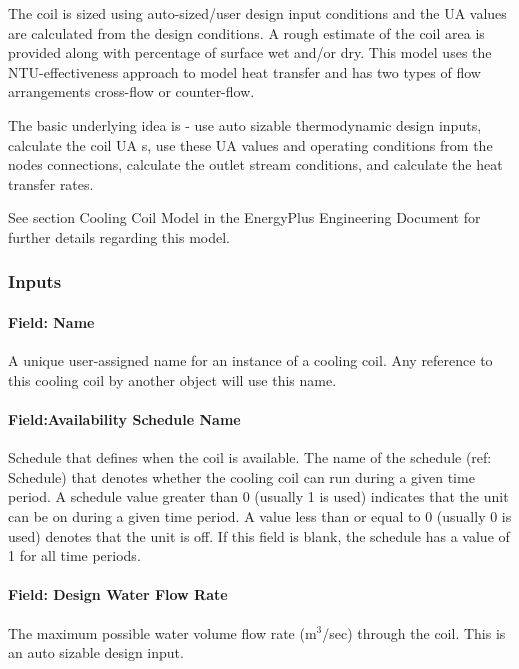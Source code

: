 The coil is sized using auto-sized/user design input conditions and the UA values are calculated from the design conditions. A rough estimate of the coil area is provided along with percentage of surface wet and/or dry. This model uses the NTU-effectiveness approach to model heat transfer and has two types of flow arrangements cross-flow or counter-flow.

The basic underlying idea is - use auto sizable thermodynamic design inputs, calculate the coil UA s, use these UA values and operating conditions from the nodes connections, calculate the outlet stream conditions, and calculate the heat transfer rates.

See section Cooling Coil Model in the EnergyPlus Engineering Document for further details regarding this model.

\subsubsection{Inputs}\label{inputs-022}

\paragraph{Field: Name}\label{field-name-021}

A unique user-assigned name for an instance of a cooling coil. Any reference to this cooling coil by another object will use this name.

\paragraph{Field:Availability Schedule Name}\label{fieldavailability-schedule-name-000}

Schedule that defines when the coil is available. The name of the schedule (ref: Schedule) that denotes whether the cooling coil can run during a given time period. A schedule value greater than 0 (usually 1 is used) indicates that the unit can be on during a given time period. A value less than or equal to 0 (usually 0 is used) denotes that the unit is off. If this field is blank, the schedule has a value of 1 for all time periods.

\paragraph{Field: Design Water Flow Rate}\label{field-design-water-flow-rate-000}

The maximum possible water volume flow rate (m\(^{3}\)/sec) through the coil. This is an auto sizable design input.

